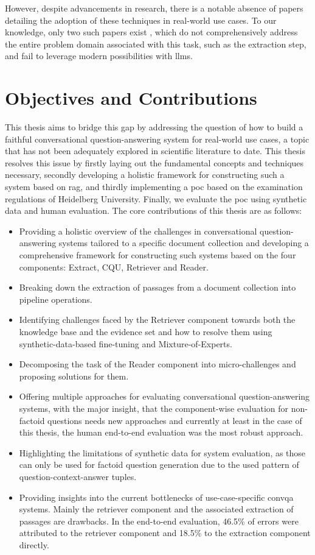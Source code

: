 However, despite advancements in research, there is a notable absence of papers detailing the adoption of these techniques in real-world use cases. To our knowledge, only two such papers exist \cite{feng_dialdoc_2021,gholami_zero-shot_2021}, which do not comprehensively address the entire problem domain associated with this task, such as the extraction step, and fail to leverage modern possibilities with \gls{llm}s.

\section{Objectives and Contributions}

This thesis aims to bridge this gap by addressing the question of how to build a faithful conversational question-answering system for real-world use cases, a topic that has not been adequately explored in scientific literature to date. This thesis resolves this issue by firstly laying out the fundamental concepts and techniques necessary, secondly developing a holistic framework for constructing such a system based on \gls{rag}, and thirdly implementing a \gls{poc} based on the examination regulations of Heidelberg University. Finally, we evaluate the \gls{poc} using synthetic data and human evaluation. The core contributions of this thesis are as follows:

\begin{itemize}
    \item Providing a holistic overview of the challenges in conversational question-answering systems tailored to a specific document collection and developing a comprehensive framework for constructing such systems based on the four components: Extract, CQU, Retriever and Reader.
    \item Breaking down the extraction of passages from a document collection into pipeline operations.
    \item Identifying challenges faced by the Retriever component towards both the knowledge base and the evidence set and how to resolve them using synthetic-data-based fine-tuning and Mixture-of-Experts.
    \item Decomposing the task of the Reader component into micro-challenges and proposing solutions for them.
    \item Offering multiple approaches for evaluating conversational question-answering systems, with the major insight, that the component-wise evaluation for non-factoid questions needs new approaches and currently at least in the case of this thesis, the human end-to-end evaluation was the most robust approach.
    \item Highlighting the limitations of synthetic data for system evaluation, as those can only be used for factoid question generation due to the used pattern of question-context-answer tuples.
    \item Providing insights into the current bottlenecks of use-case-specific \gls{convqa} systems. Mainly the retriever component and the associated extraction of passages are drawbacks. In the end-to-end evaluation, 46.5\% of errors were attributed to the retriever component and 18.5\% to the extraction component directly.
\end{itemize}

